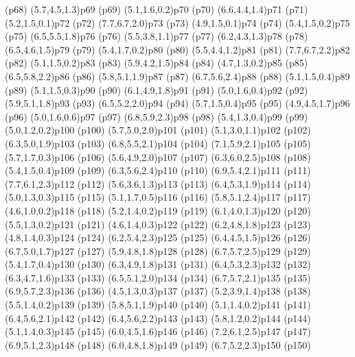 \psdot(p68)
\psPoint(5.7,4.5,1.3){p69}
\psdot(p69)
\psPoint(5.1,1.6,0.2){p70}
\psdot(p70)
\psPoint(6.6,4.4,1.4){p71}
\psdot(p71)
\psPoint(5.2,1.5,0.1){p72}
\psdot(p72)
\psPoint(7.7,6.7,2.0){p73}
\psdot(p73)
\psPoint(4.9,1.5,0.1){p74}
\psdot(p74)
\psPoint(5.4,1.5,0.2){p75}
\psdot(p75)
\psPoint(6.5,5.5,1.8){p76}
\psdot(p76)
\psPoint(5.5,3.8,1.1){p77}
\psdot(p77)
\psPoint(6.2,4.3,1.3){p78}
\psdot(p78)
\psPoint(6.5,4.6,1.5){p79}
\psdot(p79)
\psPoint(5.4,1.7,0.2){p80}
\psdot(p80)
\psPoint(5.5,4.4,1.2){p81}
\psdot(p81)
\psPoint(7.7,6.7,2.2){p82}
\psdot(p82)
\psPoint(5.1,1.5,0.2){p83}
\psdot(p83)
\psPoint(5.9,4.2,1.5){p84}
\psdot(p84)
\psPoint(4.7,1.3,0.2){p85}
\psdot(p85)
\psPoint(6.5,5.8,2.2){p86}
\psdot(p86)
\psPoint(5.8,5.1,1.9){p87}
\psdot(p87)
\psPoint(6.7,5.6,2.4){p88}
\psdot(p88)
\psPoint(5.1,1.5,0.4){p89}
\psdot(p89)
\psPoint(5.1,1.5,0.3){p90}
\psdot(p90)
\psPoint(6.1,4.9,1.8){p91}
\psdot(p91)
\psPoint(5.0,1.6,0.4){p92}
\psdot(p92)
\psPoint(5.9,5.1,1.8){p93}
\psdot(p93)
\psPoint(6.5,5.2,2.0){p94}
\psdot(p94)
\psPoint(5.7,1.5,0.4){p95}
\psdot(p95)
\psPoint(4.9,4.5,1.7){p96}
\psdot(p96)
\psPoint(5.0,1.6,0.6){p97}
\psdot(p97)
\psPoint(6.8,5.9,2.3){p98}
\psdot(p98)
\psPoint(5.4,1.3,0.4){p99}
\psdot(p99)
\psPoint(5.0,1.2,0.2){p100}
\psdot(p100)
\psPoint(5.7,5.0,2.0){p101}
\psdot(p101)
\psPoint(5.1,3.0,1.1){p102}
\psdot(p102)
\psPoint(6.3,5.0,1.9){p103}
\psdot(p103)
\psPoint(6.8,5.5,2.1){p104}
\psdot(p104)
\psPoint(7.1,5.9,2.1){p105}
\psdot(p105)
\psPoint(5.7,1.7,0.3){p106}
\psdot(p106)
\psPoint(5.6,4.9,2.0){p107}
\psdot(p107)
\psPoint(6.3,6.0,2.5){p108}
\psdot(p108)
\psPoint(5.4,1.5,0.4){p109}
\psdot(p109)
\psPoint(6.3,5.6,2.4){p110}
\psdot(p110)
\psPoint(6.9,5.4,2.1){p111}
\psdot(p111)
\psPoint(7.7,6.1,2.3){p112}
\psdot(p112)
\psPoint(5.6,3.6,1.3){p113}
\psdot(p113)
\psPoint(6.4,5.3,1.9){p114}
\psdot(p114)
\psPoint(5.0,1.3,0.3){p115}
\psdot(p115)
\psPoint(5.1,1.7,0.5){p116}
\psdot(p116)
\psPoint(5.8,5.1,2.4){p117}
\psdot(p117)
\psPoint(4.6,1.0,0.2){p118}
\psdot(p118)
\psPoint(5.2,1.4,0.2){p119}
\psdot(p119)
\psPoint(6.1,4.0,1.3){p120}
\psdot(p120)
\psPoint(5.5,1.3,0.2){p121}
\psdot(p121)
\psPoint(4.6,1.4,0.3){p122}
\psdot(p122)
\psPoint(6.2,4.8,1.8){p123}
\psdot(p123)
\psPoint(4.8,1.4,0.3){p124}
\psdot(p124)
\psPoint(6.2,5.4,2.3){p125}
\psdot(p125)
\psPoint(6.4,4.5,1.5){p126}
\psdot(p126)
\psPoint(6.7,5.0,1.7){p127}
\psdot(p127)
\psPoint(5.9,4.8,1.8){p128}
\psdot(p128)
\psPoint(6.7,5.7,2.5){p129}
\psdot(p129)
\psPoint(5.4,1.7,0.4){p130}
\psdot(p130)
\psPoint(6.3,4.9,1.8){p131}
\psdot(p131)
\psPoint(6.4,5.3,2.3){p132}
\psdot(p132)
\psPoint(6.3,4.7,1.6){p133}
\psdot(p133)
\psPoint(6.5,5.1,2.0){p134}
\psdot(p134)
\psPoint(6.7,5.7,2.1){p135}
\psdot(p135)
\psPoint(6.9,5.7,2.3){p136}
\psdot(p136)
\psPoint(4.5,1.3,0.3){p137}
\psdot(p137)
\psPoint(5.2,3.9,1.4){p138}
\psdot(p138)
\psPoint(5.5,1.4,0.2){p139}
\psdot(p139)
\psPoint(5.8,5.1,1.9){p140}
\psdot(p140)
\psPoint(5.1,1.4,0.2){p141}
\psdot(p141)
\psPoint(6.4,5.6,2.1){p142}
\psdot(p142)
\psPoint(6.4,5.6,2.2){p143}
\psdot(p143)
\psPoint(5.8,1.2,0.2){p144}
\psdot(p144)
\psPoint(5.1,1.4,0.3){p145}
\psdot(p145)
\psPoint(6.0,4.5,1.6){p146}
\psdot(p146)
\psPoint(7.2,6.1,2.5){p147}
\psdot(p147)
\psPoint(6.9,5.1,2.3){p148}
\psdot(p148)
\psPoint(6.0,4.8,1.8){p149}
\psdot(p149)
\psPoint(6.7,5.2,2.3){p150}
\psdot(p150)

